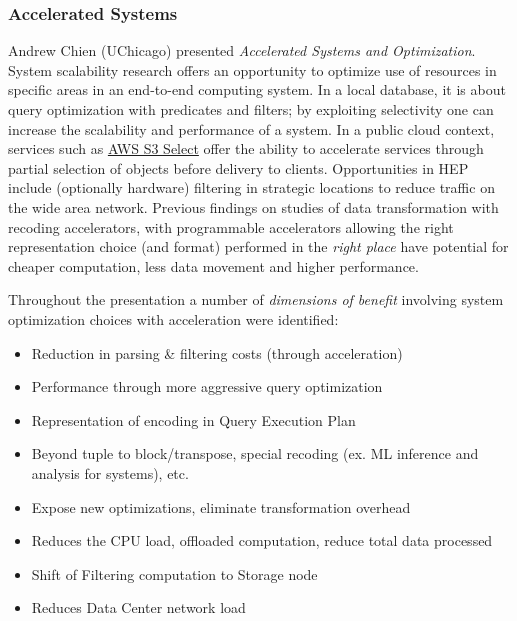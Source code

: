 \documentclass[11pt,letterpaper,fleqn]{article}
\begin{document}
\subsubsection{Accelerated Systems}
\vspace{0.2cm}
Andrew Chien (UChicago) presented {\it Accelerated Systems and Optimization}.  System scalability research offers an opportunity to optimize use of resources in specific areas in an end-to-end computing system.   In a local database, it is about query optimization with predicates and filters; by exploiting selectivity one can increase the scalability and performance of a system. In a public cloud context, services such as \href{https://aws.amazon.com/blogs/aws/s3-glacier-select/}{AWS S3 Select} offer the ability to accelerate services through partial selection of objects before delivery to clients.  Opportunities in HEP include (optionally hardware) filtering in strategic locations to reduce traffic on the wide area network.  Previous findings on studies of data transformation with recoding accelerators, with programmable accelerators allowing the right representation choice (and format) performed in the {\it right place} have potential for cheaper computation, less data movement and higher performance.

Throughout the presentation a number of {\it dimensions of benefit} involving system optimization choices with acceleration were identified:

\begin{itemize}
  \item Reduction in parsing \& filtering costs (through acceleration)
  \item Performance through more aggressive query optimization
  \item Representation of encoding in Query Execution Plan
  \item Beyond tuple to block/transpose, special recoding (ex. ML inference and analysis for systems), etc.
  \item Expose new optimizations, eliminate transformation overhead
  \item Reduces the CPU load, offloaded computation, reduce total data processed
  \item Shift of Filtering computation to Storage node
  \item Reduces Data Center network load
\end{itemize}

\end{document}
